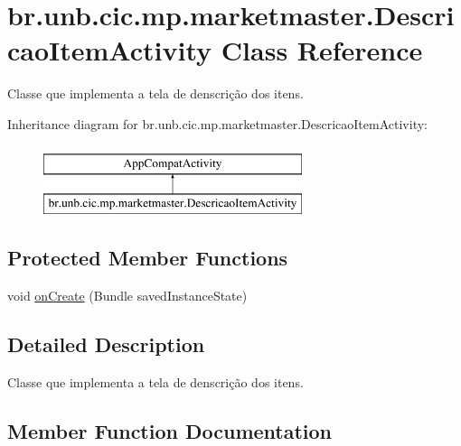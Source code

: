 \hypertarget{classbr_1_1unb_1_1cic_1_1mp_1_1marketmaster_1_1DescricaoItemActivity}{}\section{br.\+unb.\+cic.\+mp.\+marketmaster.\+Descricao\+Item\+Activity Class Reference}
\label{classbr_1_1unb_1_1cic_1_1mp_1_1marketmaster_1_1DescricaoItemActivity}


Classe que implementa a tela de denscrição dos itens.  


Inheritance diagram for br.\+unb.\+cic.\+mp.\+marketmaster.\+Descricao\+Item\+Activity\+:\begin{figure}[H]
\begin{center}
\leavevmode
\includegraphics[height=2.000000cm]{classbr_1_1unb_1_1cic_1_1mp_1_1marketmaster_1_1DescricaoItemActivity}
\end{center}
\end{figure}
\subsection*{Protected Member Functions}
\begin{DoxyCompactItemize}
\item 
void \mbox{\hyperlink{classbr_1_1unb_1_1cic_1_1mp_1_1marketmaster_1_1DescricaoItemActivity_aaa46c92117313a52d84a4457151a28c2}{on\+Create}} (Bundle saved\+Instance\+State)
\end{DoxyCompactItemize}


\subsection{Detailed Description}
Classe que implementa a tela de denscrição dos itens. 

\subsection{Member Function Documentation}
\mbox{\label{classbr_1_1unb_1_1cic_1_1mp_1_1marketmaster_1_1DescricaoItemActivity_aaa46c92117313a52d84a4457151a28c2}} 
